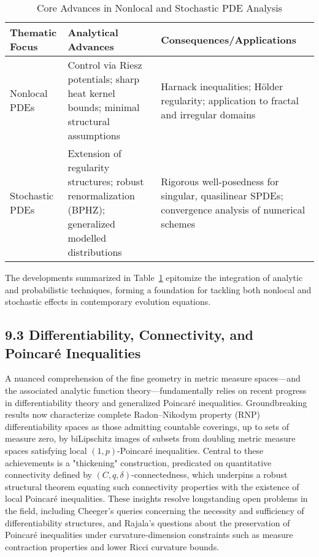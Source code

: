 \documentclass[11pt]{article}
\begin{document}
\begin{table}[ht]
    \centering
    \caption{Core Advances in Nonlocal and Stochastic PDE Analysis}
    \label{tab:nonlocal_stochastic_advances}
    \begin{tabular}{|l|p{4.6cm}|p{4.9cm}|}
        \hline
        \textbf{Thematic Focus} & \textbf{Analytical Advances} & \textbf{Consequences/Applications} \\
        \hline
        Nonlocal PDEs & Control via Riesz potentials; sharp heat kernel bounds; minimal structural assumptions & Harnack inequalities; Hölder regularity; application to fractal and irregular domains \\
        \hline
        Stochastic PDEs & Extension of regularity structures; robust renormalization (BPHZ); generalized modelled distributions & Rigorous well-posedness for singular, quasilinear SPDEs; convergence analysis of numerical schemes \\
        \hline
    \end{tabular}
\end{table}

The developments summarized in Table~\ref{tab:nonlocal_stochastic_advances} epitomize the integration of analytic and probabilistic techniques, forming a foundation for tackling both nonlocal and stochastic effects in contemporary evolution equations.

\subsection{9.3 Differentiability, Connectivity, and Poincaré Inequalities}

A nuanced comprehension of the fine geometry in metric measure spaces—and the associated analytic function theory—fundamentally relies on recent progress in differentiability theory and generalized Poincaré inequalities. Groundbreaking results now characterize complete Radon–Nikodym property (RNP) differentiability spaces as those admitting countable coverings, up to sets of measure zero, by biLipschitz images of subsets from doubling metric measure spaces satisfying local $(1,p)$-Poincaré inequalities. Central to these achievements is a "thickening" construction, predicated on quantitative connectivity defined by $(C, q, \delta)$-connectedness, which underpins a robust structural theorem equating such connectivity properties with the existence of local Poincaré inequalities. These insights resolve longstanding open problems in the field, including Cheeger's queries concerning the necessity and sufficiency of differentiability structures, and Rajala's questions about the preservation of Poincaré inequalities under curvature-dimension constraints such as measure contraction properties and lower Ricci curvature bounds.
\end{document}
